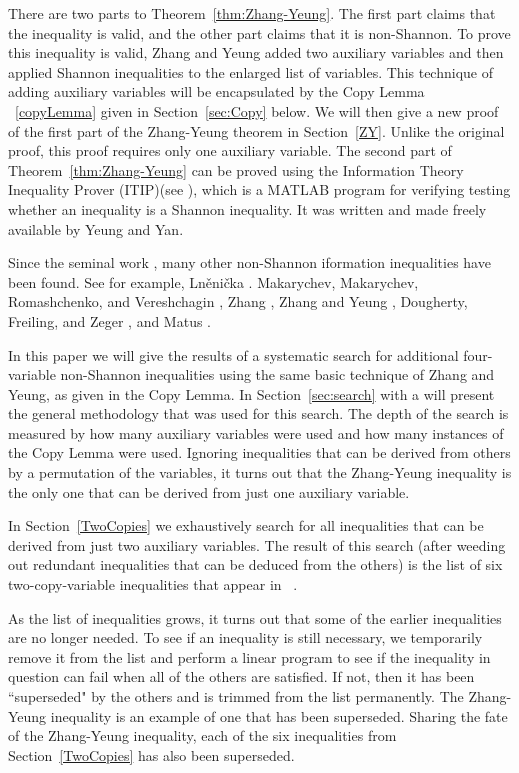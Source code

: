 \documentclass[10pt,journal]{IEEEtran}
\begin{document}
There are two parts to Theorem~\ref{thm:Zhang-Yeung}.  The first part claims that the inequality is
valid, and the other part claims that it is non-Shannon.
To prove this inequality is valid, Zhang and Yeung added two auxiliary variables
and then applied Shannon inequalities to the enlarged list of variables.  This
technique of adding auxiliary variables will be encapsulated by the
Copy Lemma ~\ref{copyLemma} given in Section~\ref{sec:Copy} below.   We will then give a new proof of the first part of the
Zhang-Yeung theorem in Section~\ref{ZY}. Unlike the original proof,
this proof requires only one auxiliary variable.  The second part of Theorem~\ref{thm:Zhang-Yeung}
can be proved using the Information Theory Inequality Prover (ITIP)(see \cite{ITIP}),
which is a MATLAB \cite{MATLAB} program for verifying testing whether an inequality is a Shannon inequality.
It was written and made freely available by Yeung and Yan.

Since the seminal work \cite{Zhang-Yeung-July98}, many other
non-Shannon iformation inequalities have been found.  See for example,
%
Ln\v{e}ni\v{c}ka \cite{Lnenicka03}.
Makarychev, Makarychev, Romashchenko, and Vereshchagin \cite{Makarychev-Makarychev-Romashchenko-Vereshchagin02},
Zhang \cite{Zhang03},
Zhang and Yeung \cite{Zhang-Yeung-Nov97},
Dougherty, Freiling, and Zeger \cite{SixNew},
and
Matus \cite{Matus}.

In this paper we will give the results of a systematic search for
additional four-variable non-Shannon inequalities using the same basic technique of Zhang and Yeung, as
given in the Copy Lemma.
In Section~\ref{sec:search} with a will present the general methodology
that was used for this search.  The depth of the search is measured by how many auxiliary variables were used
and how many instances of the Copy Lemma were used.  Ignoring inequalities that can be derived from others
by a permutation of the variables, it turns out that the Zhang-Yeung inequality is the only
one that can be derived from just one auxiliary variable.

In Section~\ref{TwoCopies} we exhaustively search
for all inequalities that can be derived from just two auxiliary variables.
The result of this search (after weeding out redundant inequalities that can be
deduced from the others) is the list of six two-copy-variable inequalities
that appear in ~\cite{SixNew}.

As the list of inequalities grows, it turns out that some of the earlier inequalities are no longer needed.
To see if an inequality is still necessary, we
temporarily remove it from the list and perform a linear program to see if the inequality in question can fail when all of the
others are satisfied.  If not, then it has been ``superseded" by the others and is trimmed from the list permanently.
The Zhang-Yeung inequality is an example of one that has been superseded.
Sharing the fate of the Zhang-Yeung inequality,
each of the six inequalities from Section~\ref{TwoCopies}
has also been superseded.
\end{document}
